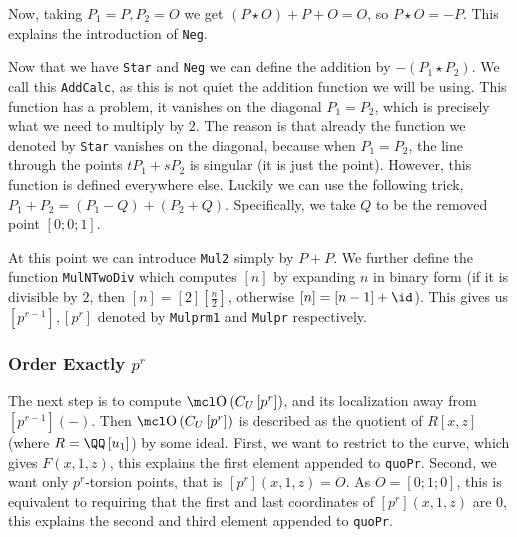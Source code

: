 Now, taking $P_1 = P, P_2 = O$ we get $\left(P \star O\right) + P + O = O$, so $P \star O = -P$.
This explains the introduction of \texttt{Neg}.

Now that we have \texttt{Star} and \texttt{Neg} we can define the addition by $-\left(P_1 \star P_2\right)$.
We call this \texttt{AddCalc}, as this is not quiet the addition function we will be using.
This function has a problem, it vanishes on the diagonal $P_1 = P_2$, which is precisely what we need to multiply by $2$.
The reason is that already the function we denoted by \texttt{Star} vanishes on the diagonal, because when $P_1 = P_2$, the line through the points $t P_1 + s P_2$ is singular (it is just the point).
However, this function is defined everywhere else.
Luckily we can use the following trick, $P_1 + P_2 = \left(P_1 - Q\right) + \left(P_2 + Q\right)$.
Specifically, we take $Q$ to be the removed point $\left[0;0;1\right]$.

At this point we can introduce \texttt{Mul2} simply by $P+P$.
We further define the function \texttt{MulNTwoDiv} which computes $\left[n\right]$ by expanding $n$ in binary form (if it is divisible by $2$, then $\left[n\right] = \left[2\right]\left[\frac{n}{2}\right]$, otherwise $\left[n\right] = \left[n-1\right]+\id$).
This gives us $\left[p^{r-1}\right],\left[p^r\right]$ denoted by \texttt{Mulprm1} and \texttt{Mulpr} respectively.

\subsubsection{Order Exactly $p^r$}

The next step is to compute $\OO\left(C_U\left[p^r\right]\right)$, and its localization away from $[p^{r-1}]\left(-\right)$.
Then $\OO\left(C_U\left[p^r\right]\right)$ is described as the quotient of $R\left[x, z\right]$ (where $R = \QQ\left[u_1\right]$) by some ideal.
First, we want to restrict to the curve, which gives $F\left(x,1,z\right)$, this explains the first element appended to \texttt{quoPr}.
Second, we want only $p^r$-torsion points, that is $\left[p^r\right]\left(x,1,z\right) = O$.
As $O = \left[0;1;0\right]$, this is equivalent to requiring that the first and last coordinates of $\left[p^r\right]\left(x,1,z\right)$ are $0$, this explains the second and third element appended to \texttt{quoPr}.

